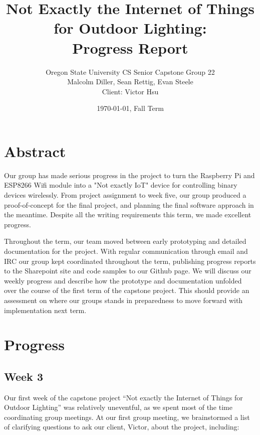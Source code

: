 \documentclass[letterpaper,10pt]{article}
\title{Not Exactly the Internet of Things for Outdoor Lighting:\\Progress Report}
\author{Oregon State University CS Senior Capstone Group 22\\
Malcolm Diller, Sean Rettig, Evan Steele\\
Client: Victor Hsu}
\date{\today, Fall Term}
\begin{document}
\maketitle

\section{Abstract}

Our group has made serious progress in the project to turn the Raspberry Pi and
ESP8266 Wifi module into a "Not exactly IoT" device for controlling binary
devices wirelessly. From project assignment to week five, our group produced a
proof-of-concept for the final project, and planning the final software
approach in the meantime. Despite all the writing requirements this term, we
made excellent progress.

Throughout the term, our team moved between early prototyping and detailed
documentation for the project. With regular communication through email and IRC
our group kept coordinated throughout the term, publishing progress reports to
the Sharepoint site and code samples to our Github page. We will discuss our
weekly progress and describe how the prototype and documentation unfolded over
the course of the first term of the capstone project. This should provide an
assessment on where our groups stands in preparedness to move forward with
implementation next term.

\pagebreak

\section{Progress}

\subsection{Week 3}

Our first week of the capstone project ``Not exactly the Internet of Things for
Outdoor Lighting'' was relatively uneventful, as we spent most of the time
coordinating group meetings.  At our first group meeting, we brainstormed a
list of clarifying questions to ask our client, Victor, about the project,
including:
\end{document}
